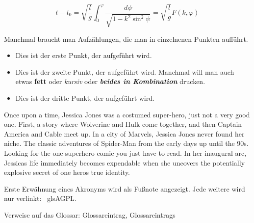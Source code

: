 \begin{equation}
t-t_{0}=\sqrt{\frac{l}{g}}\int_{0}^{\varphi}{\frac{d\psi}{\sqrt{1-k^{2}\sin^{2} {\psi}}}} = \sqrt{\frac{l}{g}} F(k,\varphi)
\label{xyz}
\end{equation}

Manchmal braucht man Aufzählungen, die man in einzelnenen Punkten aufführt.
\begin{itemize}
\item Dies ist der erste Punkt, der aufgeführt wird.
\item Dies ist der zweite Punkt, der aufgeführt wird. Manchmal will man auch etwas \textbf{fett} oder \textit{kursiv} oder \textbf{\textit{beides in Kombination}}  drucken.
\item Dies ist der dritte Punkt, der aufgeführt wird.
\end{itemize}

Once upon a time, Jessica Jones was a costumed super-hero, just not a very good one. First, a story where Wolverine and Hulk come together, and then Captain America and Cable meet up. In a city of Marvels, Jessica Jones never found her niche. The classic adventures of Spider-Man from the early days up until the 90s. Looking for the one superhero comic you just have to read. In her inaugural arc, Jessicas life immediately becomes expendable when she uncovers the potentially explosive secret of one heros true identity.

Erste Erwähnung eines Akronyms wird als Fußnote angezeigt. Jede weitere wird
nur verlinkt: \ gls{AGPL}.

Verweise auf das Glossar: \gls{Glossareintrag}, \glspl{Glossareintrag}

